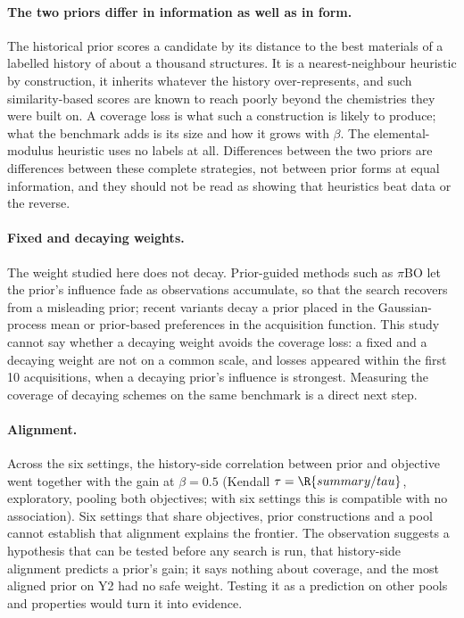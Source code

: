 \paragraph{The two priors differ in information as well as in form.} The historical prior scores a candidate by its distance
to the best materials of a labelled history of about a thousand structures. It is a nearest-neighbour heuristic by construction,
it inherits whatever the history over-represents\cite{jia2019anthropogenic}, and such similarity-based scores are known to reach
poorly beyond the chemistries they were built on\cite{meredig2018loco}. A coverage loss is what such a construction is likely to
produce; what the benchmark adds is its size and how it grows with $\beta$. The
elemental-modulus heuristic uses no labels at all. Differences between the two priors are differences between these complete
strategies, not between prior forms at equal information, and they should not be read as showing that heuristics beat data or
the reverse.

\paragraph{Fixed and decaying weights.} The weight studied here does not decay. Prior-guided methods such as $\pi$BO let the
prior's influence fade as observations accumulate, so that the search recovers from a misleading
prior\cite{hvarfner2022pibo,souza2021bopro}; recent variants decay a prior placed in the Gaussian-process mean\cite{qu2026dynmeanbo}
or prior-based preferences in the acquisition function\cite{fehring2025dynabo}. This study cannot say whether a decaying weight avoids the coverage loss: a fixed and a
decaying weight are not on a common scale, and losses appeared within the first 10 acquisitions, when a decaying prior's influence
is strongest. Measuring the coverage of decaying schemes on the same benchmark is a direct next step.

\paragraph{Alignment.} Across the six settings, the history-side correlation between prior and objective went together with the
gain at $\beta=0.5$ (Kendall $\tau=\R{summary/tau}$, exploratory, pooling both objectives; with six settings this is compatible with no
association). Six settings that share objectives,
prior constructions and a pool cannot establish that alignment explains the frontier. The observation suggests a hypothesis that
can be tested before any search is run, that history-side alignment predicts a prior's gain; it says nothing about coverage, and
the most aligned prior on Y2 had no safe weight. Testing it as a prediction on other pools and properties would turn it into
evidence.

